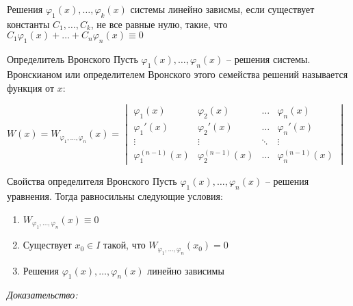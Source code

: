 \documentclass[12pt]{article}
\begin{document}
\begin{Remark}{}
    Решения $\varphi_1(x), \ldots, \varphi_k(x)$ системы линейно зависмы, если существует константы $C_1, \ldots, C_k$, не все равные нулю, такие, что $C_1\varphi_1(x) + \ldots + C_n\varphi_n(x) \equiv 0$
\end{Remark}

\begin{defin}{Определитель Вронского}
    Пусть $\varphi_1(x), \ldots, \varphi_n(x)$ -- решения системы. Вронскианом или определителем Вронского этого семейства решений называется функция от $x$:

    $W(x) = W_{\varphi_1, \ldots, \varphi_n}(x) = \begin{vmatrix}
        \varphi_1(x) & \varphi_2(x) & \ldots & \varphi_n(x) \\
        \varphi_1'(x) & \varphi_2'(x) & \ldots & \varphi_n'(x) \\
        \vdots & \vdots & \ddots & \vdots \\
        \varphi_1^{(n - 1)}(x) & \varphi_2^{(n - 1)}(x) & \ldots & \varphi_n^{(n - 1)}(x)
    \end{vmatrix}$
\end{defin}

\begin{theo}{Свойства определителя Вронского}
    Пусть $\varphi_1(x), \ldots, \varphi_n(x)$ -- решения уравнения. Тогда равносильны следующие условия: 

    \begin{enumerate}
        \item $W_{\varphi_1, \ldots, \varphi_n}(x) \equiv 0$ 
        \item Существует $x_0 \in I$ такой, что $W_{\varphi_1, \ldots, \varphi_n}(x_0) = 0$
        \item Решения $\varphi_1(x), \ldots, \varphi_n(x)$ линейно зависимы 
    \end{enumerate}
\end{theo}

\textit{Доказательство:}
\end{document}
